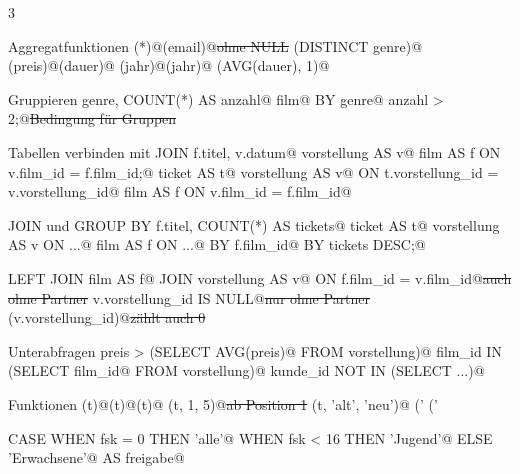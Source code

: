 \documentclass[9pt,a4paper,landscape]{extarticle}
\begin{document}
\begin{multicols*}{3}
\begin{merkblock}{Aggregatfunktionen}{}
\lstinline@COUNT(*)@\quad\lstinline@COUNT(email)@\st{ohne NULL}
\lstinline@COUNT(DISTINCT genre)@\zl
\lstinline@SUM(preis)@\quad\lstinline@AVG(dauer)@\zl
\lstinline@MIN(jahr)@\quad\lstinline@MAX(jahr)@\zl
\lstinline@ROUND(AVG(dauer), 1)@\zl
\end{merkblock}

\begin{merkblock}{Gruppieren}{}
\lstinline@SELECT genre, COUNT(*) AS anzahl@\zl
\lstinline@FROM film@\zl
\lstinline@GROUP BY genre@\zl
\lstinline@HAVING anzahl > 2;@\st{Bedingung für Gruppen}
\end{merkblock}

\begin{merkblock}{Tabellen verbinden mit JOIN}{}
\lstinline@SELECT f.titel, v.datum@\zl
\lstinline@FROM vorstellung AS v@\zl
\lstinline@JOIN film AS f ON v.film_id = f.film_id;@\zl
{}
\lstinline@FROM ticket AS t@\zl
\lstinline@JOIN vorstellung AS v@\zl
\lstinline@  ON t.vorstellung_id = v.vorstellung_id@\zl
\lstinline@JOIN film AS f ON v.film_id = f.film_id@\zl
\end{merkblock}

\begin{merkblock}{JOIN und GROUP BY}{}
\lstinline@SELECT f.titel, COUNT(*) AS tickets@\zl
\lstinline@FROM ticket AS t@\zl
\lstinline@JOIN vorstellung AS v ON ...@\zl
\lstinline@JOIN film AS f ON ...@\zl
\lstinline@GROUP BY f.film_id@\zl
\lstinline@ORDER BY tickets DESC;@\zl
\end{merkblock}

\begin{merkblock}{LEFT JOIN}{}
\lstinline@FROM film AS f@\zl
\lstinline@LEFT JOIN vorstellung AS v@\zl
\lstinline@  ON f.film_id = v.film_id@\st{auch ohne Partner}
\lstinline@WHERE v.vorstellung_id IS NULL@\st{nur ohne Partner}
\lstinline@COUNT(v.vorstellung_id)@\st{zählt auch 0}
\end{merkblock}

\begin{merkblock}{Unterabfragen}{}
\lstinline@WHERE preis > (SELECT AVG(preis)@\zl
\lstinline@               FROM vorstellung)@\zl
\lstinline@WHERE film_id IN (SELECT film_id@\zl
\lstinline@                  FROM vorstellung)@\zl
\lstinline@WHERE kunde_id NOT IN (SELECT ...)@\zl
\end{merkblock}

\begin{merkblock}{Funktionen}{}
\lstinline@UPPER(t)@\quad\lstinline@LOWER(t)@\quad\lstinline@LENGTH(t)@\zl
\lstinline@SUBSTR(t, 1, 5)@\st{ab Position 1}
\lstinline@REPLACE(t, 'alt', 'neu')@\zl
\lstinline@strftime('%d.%m.%Y', datum)@\st{02.11.2026}
\lstinline@strftime('%w', datum)@\st{'0' Sonntag}
\end{merkblock}

\begin{merkblock}{CASE}{}
\lstinline@CASE WHEN fsk = 0 THEN 'alle'@\zl
\lstinline@     WHEN fsk < 16 THEN 'Jugend'@\zl
\lstinline@     ELSE 'Erwachsene'@\zl
\lstinline@END AS freigabe@\zl
\end{merkblock}
\end{multicols*}
\end{document}
